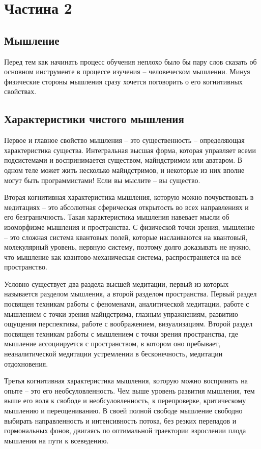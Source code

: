 \section{Частина 2}

\subsection{Мышление}

Перед тем как начинать процесс обучения неплохо было бы пару слов сказать об основном инструменте в процессе изучения – человеческом мышлении. Минуя физические стороны мышления сразу хочется поговорить о его когнитивных свойствах.

\subsection{Характеристики чистого мышления}

Первое и главное свойство мышления – это существенность -- определяющая характеристика существа. Интегральная высшая форма, которая управляет всеми подсистемами и воспринимается существом, майндстримом или аватаром. В одном теле может жить несколько майндстримов, и некоторые из них вполне могут быть программистами! Если вы мыслите – вы существо.

Вторая когнитивная характеристика мышления, которую можно почувствовать в медитациях – это абсолютная сферическая открытость во всех направлениях и его безграничность. Такая характеристика мышления навевает мысли об изоморфизме мышления и пространства. С физической точки зрения, мышление – это сложная система квантовых полей, которые наслаиваются на квантовый, молекулярный уровень, нервную систему, поэтому долго доказывать не нужно, что мышление как квантово-механическая система, распространяется на всё пространство.

Условно существует два раздела высшей медитации, первый из которых называется разделом мышления, а второй разделом пространства. Первый раздел посвящен техникам работы с феноменами, аналитической медитации, работе с мышлением с точки зрения майндстрима, глазным упражнениям, развитию ощущения перспективы, работе с воображением, визуализациям. Второй раздел посвящен техникам работы с мышлением с точки зрения пространства, где мышление ассоциируется с пространством, в котором оно пребывает, неаналитической медитации устремлении в бесконечность, медитации отдохновения.

Третья когнитивная характеристика мышления, которую можно воспринять на опыте – это его необсуловленность. Чем выше уровень развития мышления, тем выше его воля к свободе и необсуловленность, к перепроверке, критическому мышлению и переоцениванию. В своей полной свободе мышление свободно выбирать направленность и интенсивность потока, без резких перепадов и гормональных фонов, двигаясь по оптимальной траектории взрослении плода мышления на пути к всеведению.

